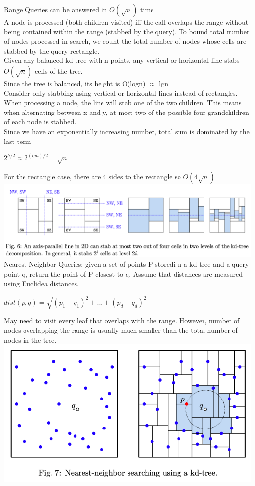 \documentclass{article}
\begin{document}
  Range Queries can be answered in $O(\sqrt{n})$ time \\
  A node is processed (both children visited) iff the call overlaps the range without being contained within the range (stabbed by the query). To bound total number of nodes processed in search, we count the total number of nodes whose cells are stabbed by the query rectangle. \\
  Given any balanced kd-tree with n points, any vertical or horizontal line stabs $O(\sqrt{n})$ cells of the tree. \\
  Since the tree is balanced, its height is O(logn) $\approx$ lgn\\
  Consider only stabbing using vertical or horizontal lines instead of rectangles. When processing a node, the line will stab one of the two children. This means when alternating between x and y, at most two of the possible four grandchildren of each node is stabbed.\\
  Since we have an exponentially increasing number, total sum is dominated by the last term
  \begin{center}
    $2^{h/2} \approx 2^{(lgn)/2} = \sqrt{n}$
  \end{center}
  For the rectangle case, there are 4 sides to the rectangle so $O(4\sqrt{n})$\\
  \includegraphics[width=\textwidth]{RangeQueryProof}
  Nearest-Neighbor Queries: given a set of points P storedi n a kd-tree and a query point q, return the point of P closest to q. Assume that distances are measured using Euclidea distances.
  \begin{center}
    $dist(p,q) = \sqrt{(p_{1}-q_{1})^{2} + ... + (p_{d}-q_{d})^{2}}$
  \end{center}
  May need to visit every leaf that overlaps with the range. However, number of nodes overlapping the range is usually much smaller than the total number of nodes in the tree. \\
  \includegraphics[width=\textwidth]{NearestNeighborExample}
\end{document}
